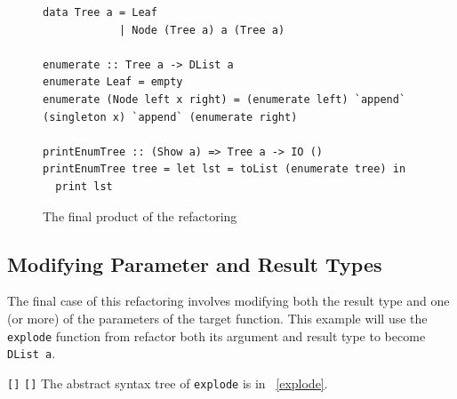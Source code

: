 \begin{figure}[t]
\begin{lstlisting}
data Tree a = Leaf
            | Node (Tree a) a (Tree a)

enumerate :: Tree a -> DList a
enumerate Leaf = empty
enumerate (Node left x right) = (enumerate left) `append` (singleton x) `append` (enumerate right)

printEnumTree :: (Show a) => Tree a -> IO ()
printEnumTree tree = let lst = toList (enumerate tree) in
  print lst
\end{lstlisting}
\caption{The final product of the refactoring}
\label{enumFinal}
\end{figure}

\subsection{Modifying Parameter and Result Types}

The final case of this refactoring involves modifying both the result type and one (or more) of the parameters of the target function. This example will use the \texttt{explode} function from \DIFdelbegin {}\DIFdelend \DIFaddbegin {}\DIFaddend refactor both its argument and result type to become \texttt{DList a}. \DIFdelbegin %

{%
\texttt{}%
}

\DIFdelend \DIFaddbegin \texttt{} \texttt{[]} \texttt{[]}\texttt{} \DIFaddend The abstract syntax tree of \texttt{explode} is in \DIFdelbegin {}\DIFdelend \DIFaddbegin {}\DIFaddend ~\ref{explode}.

